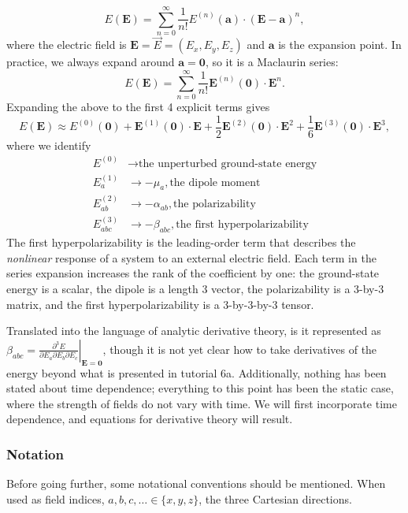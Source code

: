 \documentclass[11pt]{article}
\begin{document}
\[
  E(\mathbf{E}) = \sum_{n=0}^{\infty} \frac{1}{n!}E^{(n)}(\mathbf{a})\cdot(\mathbf{E}-\mathbf{a})^{n},
\]
where the electric field is \(\mathbf{E} = \vec{E} = (E_x,E_y,E_z)\) and \(\mathbf{a}\) is the expansion point. In practice, we always expand around \(\mathbf{a} = \mathbf{0}\), so it is a Maclaurin series:
\[
  E(\mathbf{E}) = \sum_{n=0}^{\infty} \frac{1}{n!}\mathbf{E}^{(n)}(\mathbf{0})\cdot\mathbf{E}^{n}.
\]
Expanding the above to the first 4 explicit terms gives
\[
  E(\mathbf{E}) \approx E^{(0)}(\mathbf{0}) + \mathbf{E}^{(1)}(\mathbf{0})\cdot\mathbf{E} + \frac{1}{2}\mathbf{E}^{(2)}(\mathbf{0})\cdot\mathbf{E}^{2} + \frac{1}{6}\mathbf{E}^{(3)}(\mathbf{0})\cdot\mathbf{E}^{3},
\]
where we identify
\begin{align}
  E^{(0)} &\rightarrow \textrm{the unperturbed ground-state energy} \\
  E_{a}^{(1)} &\rightarrow -\mu_{a},\textrm{the dipole moment} \\
  E_{ab}^{(2)} &\rightarrow -\alpha_{ab},\textrm{the polarizability} \\
  E_{abc}^{(3)} &\rightarrow -\beta_{abc},\textrm{the first hyperpolarizability}
\end{align}
The first hyperpolarizability is the leading-order term that describes the \emph{nonlinear} response of a system to an external electric field.  Each term in the series expansion increases the rank of the coefficient by one: the ground-state energy is a scalar, the dipole is a length 3 vector, the polarizability is a 3-by-3 matrix, and the first hyperpolarizability is a 3-by-3-by-3 tensor.

Translated into the language of analytic derivative theory, is it represented as \(\beta_{abc} = \left.\frac{\partial^{3} E}{\partial E_a \partial E_b \partial E_c}\right|_{\mathbf{E}=\mathbf{0}}\), though it is not yet clear how to take derivatives of the energy beyond what is presented in tutorial 6a. Additionally, nothing has been stated about time dependence; everything to this point has been the static case, where the strength of fields do not vary with time. We will first incorporate time dependence, and equations for derivative theory will result.

\hypertarget{notation}{%
  \subsubsection{Notation}\label{notation}}

Before going further, some notational conventions should be mentioned.  When used as field indices, \(a,b,c,\dots \in \{x,y,z\}\), the three Cartesian directions.
\end{document}
